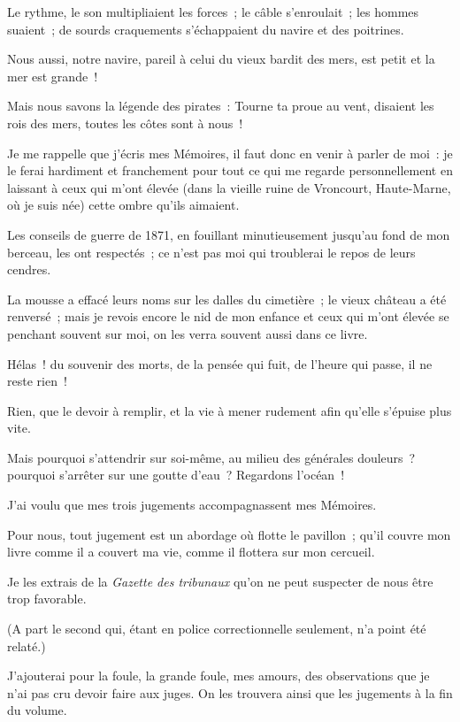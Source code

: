 \documentclass[french,twoside]{book} %
\newcommand\chapterclose{} %
\begin{document}
\noindent Le rythme, le son multipliaient les forces ; le câble s’enroulait ; les hommes suaient ; de sourds  craquements s’échappaient du navire et des poitrines.\par
Nous aussi, notre navire, pareil à celui du vieux bardit des mers, est petit et la mer est grande !\par
Mais nous savons la légende des pirates : Tourne ta proue au vent, disaient les rois des mers, toutes les côtes sont à nous !\par
Je me rappelle que j’écris mes Mémoires, il faut donc en venir à parler de moi : je le ferai hardiment et franchement pour tout ce qui me regarde personnellement en laissant à ceux qui m’ont élevée (dans la vieille ruine de Vroncourt, Haute-Marne, où je suis née) cette ombre qu’ils aimaient.\par
Les conseils de guerre de 1871, en fouillant minutieusement jusqu’au fond de mon berceau, les ont respectés ; ce n’est pas moi qui troublerai le repos de leurs cendres.\par
La mousse a effacé leurs noms sur les dalles du cimetière ; le vieux château a été renversé ; mais je revois encore le nid de mon enfance et ceux qui m’ont élevée se penchant souvent sur moi, on les verra souvent aussi dans ce livre.\par
Hélas ! du souvenir des morts, de la pensée qui fuit, de l’heure qui passe, il ne reste rien !\par
Rien, que le devoir à remplir, et la vie à mener rudement afin qu’elle s’épuise plus vite.\par
 Mais pourquoi s’attendrir sur soi-même, au milieu des générales douleurs ? pourquoi s’arrêter sur une goutte d’eau ? Regardons l’océan !\par
J’ai voulu que mes trois jugements accompagnassent mes Mémoires.\par
Pour nous, tout jugement est un abordage où flotte le pavillon ; qu’il couvre mon livre comme il a couvert ma vie, comme il flottera sur mon cercueil.\par
Je les extrais de la \emph{Gazette des tribunaux} qu’on ne peut suspecter de nous être trop favorable.\par
(A part le second qui, étant en police correctionnelle seulement, n’a point été relaté.)\par
J’ajouterai pour la foule, la grande foule, mes amours, des observations que je n’ai pas cru devoir faire aux juges. On les trouvera ainsi que les jugements à la fin du volume.
\chapterclose
\end{document}
